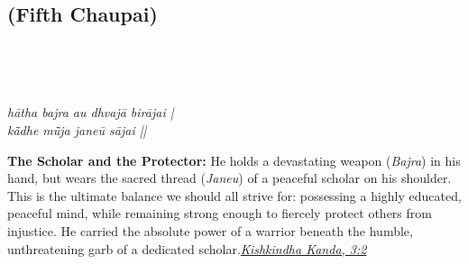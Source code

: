 
\newpage

\subsection*{ (Fifth Chaupai)}

\begin{minipage}[t]{0.55\textwidth}
\vspace{0pt}

{\large \linespread{1.5}\selectfont
{}\\
\par}

\vspace{0.5em}

{\large \linespread{1.5}\selectfont
{}\\
\par}

\vspace{0.5em}

{\large \linespread{1.3}\selectfont
\textit{hātha bajra au dhvajā birājai |}\\
\textit{kā̃dhe mū̃ja janeū sājai ||}
\par}
\end{minipage}%
\hfill
\begin{minipage}[t]{0.42\textwidth}
\vspace{0pt}
\begin{tcolorbox}[anchorbox]
\textbf{The Scholar and the Protector:} He holds a devastating weapon (\textit{Bajra}) in his hand, but wears the sacred thread (\textit{Janeu}) of a peaceful scholar on his shoulder. This is the ultimate balance we should all strive for: possessing a highly educated, peaceful mind, while remaining strong enough to fiercely protect others from injustice.
\vspace{0.5em}\newline He carried the absolute power of a warrior beneath the humble, unthreatening garb of a dedicated scholar.\newline\null\hfill\href{https://www.valmiki.iitk.ac.in/sloka?field_kanda_tid=4&language=dv&field_sarga_value=3}{\textit{Kishkindha Kanda, 3:2}}
\end{tcolorbox}
\end{minipage}

